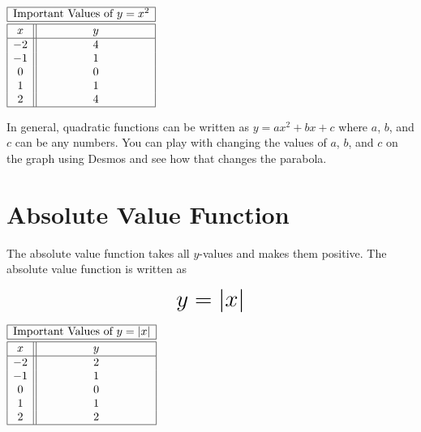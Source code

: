\documentclass[nooutcomes]{ximera}
\begin{document}
\begin{center}
$
\begin{array}{ |c || c|  }
 \hline
 \multicolumn{2}{|c|}{\text{\normalfont Important Values of } y=x^2} \\
\hline
 \hline
 x & y\\
 \hline
 -2&4\\
 -1&1\\
 0&0\\
 1&1\\
 2&4\\
 \hline
\end{array}
$
\end{center}

In general, quadratic functions can be written as $y=ax^2+bx+c$ where $a$, $b$, and $c$ can be any numbers.  You can play with changing the values of $a$, $b$, and $c$ on the graph using Desmos and see how that changes the parabola.  

\begin{center}  
\end{center}


\newpage


\section{Absolute Value Function}
The absolute value function takes all $y$-values and makes them positive.  The absolute value function is written as 

$$ \mbox{\huge $y=|x|$}$$ 

\begin{image}
\end{image}

\begin{center}
$
\begin{array}{ |c || c|  }
 \hline
 \multicolumn{2}{|c|}{\text{\normalfont Important Values of } y=|x|} \\
\hline
 \hline
 x & y\\
 \hline
 -2&2\\ 
-1&1\\ 
0&0\\
 1&1\\
 2&2\\
 \hline
\end{array}
$
\end{center}
\end{document}

